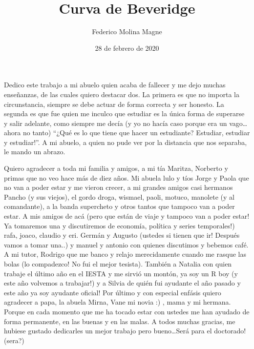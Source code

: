 \documentclass[12pt,oneside]{reedthesis}
\title{Curva de Beveridge}
\author{Federico Molina Magne}
\date{28 de febrero de 2020}
\begin{document}
  \maketitle



\frontmatter %
\pagestyle{empty} %
  \begin{dedication}
    Dedico este trabajo a mi abuelo quien acaba de fallecer y me dejo muchas enseñanzas, de las cuales quiero destacar dos. La primera es que no importa la circunstancia, siempre se debe actuar de forma correcta y ser honesto. La segunda es que fue quien me inculco que estudiar es la única forma de superarse y salir adelante, como siempre me decía (y yo no hacía caso porque era un vago\ldots{} ahora no tanto) ``¿Qué es lo que tiene que hacer un estudiante? Estudiar, estudiar y estudiar!''. A mi abuelo, a quien no pude ver por la distancia que nos separaba, le mando un abrazo.
  \end{dedication}
  \begin{acknowledgements}
    Quiero agradecer a toda mi familia y amigos, a mi tía Maritza, Norberto y primas que no veo hace más de diez años. Mi abuela lulo y tíos Jorge y Paola que no van a poder estar y me vieron crecer, a mi grandes amigos casi hermanos Pancho (y sus viejos), el gordo droga, wismael, paoli, motuco, manolete (y al comandante), a la banda supercheto y otros tantos que tampoco van a poder estar. A mis amigos de acá (pero que están de viaje y tampoco van a poder estar! Ya tomaremos una y discutiremos de economía, política y series temporales!) rafa, joaco, claudio y eri. Germán y Augusto (ustedes si tienen que ir! Después vamos a tomar una..) y manuel y antonio con quienes discutimos y bebemos café. A mi tutor, Rodrigo que me banco y relajo merecidamente cuando me rasque las bolas (lo compadezco! No fui el mejor tesista). También a Natalia con quien trabaje el último año en el IESTA y me sirvió un montón, ya soy un R boy (y este año volvemos a trabajar!) y a Silvia de quién fui ayudante el año pasado y este año ya soy ayudante oficial!
    Por último y con especial enfásis quiero agradecer a papa, la abuela Mirna, Vane mi novia :) , mama y mi hermana. Porque en cada momento que me ha tocado estar con ustedes me han ayudado de forma permanente, en las buenas y en las malas.
    A todos muchas gracias, me hubiese gustado dedicarles un mejor trabajo pero bueno\ldots{}Será para el doctorado! (sera?)
  \end{acknowledgements}
\end{document}
